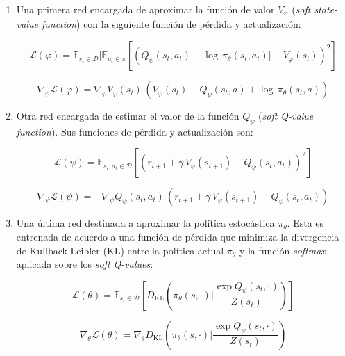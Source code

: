 \begin{enumerate}
    \item Una primera red encargada de aproximar la función de valor $V_\varphi$ (\textit{soft state-value function}) con la siguiente función de pérdida y actualización:
    
        \begin{equation}
            \mathcal{L}(\varphi) = \mathds{E}_{s_t \in \mathcal{D}} [\mathds{E}_{a_{t} \in \pi} [(Q_\psi(s_{t}, a_{t}) - \log \, \pi_\theta(s_t, a_t)] - V_\varphi(s_t) )^2]
        \end{equation}
    
        \begin{equation}
            \nabla_\varphi \mathcal{L}(\varphi) = \nabla_\varphi V_\varphi(s_t) \, (V_\varphi(s_t) - Q_\psi(s_{t}, a) + \log \, \pi_\theta(s_t, a) )
        \end{equation}
    
    \item Otra red encargada de estimar el valor de la función $Q_\psi$ (\textit{soft Q-value function}). Sus funciones de pérdida y actualización son:
    
        \begin{equation}
            \mathcal{L}(\psi) = \mathds{E}_{s_t, a_t \in \mathcal{D}} [(r_{t+1} + \gamma \, V_\varphi(s_{t+1}) - Q_\psi(s_t, a_t))^2]
        \end{equation}
        
        \begin{equation}
            \nabla_\psi \mathcal{L}(\psi) = - \nabla_\psi Q_\psi(s_t, a_t) \, (r_{t+1} + \gamma \, V_\varphi(s_{t+1}) - Q_\psi(s_t, a_t))
        \end{equation}
    
    \item Una última red destinada a aproximar la política estocástica $\pi_\theta$. Esta es entrenada de acuerdo a una función de pérdida que minimiza la divergencia de Kullback-Leibler (KL) \cite{haarnoja2018soft} entre la política actual $\pi_\theta$ y la función \textit{softmax} aplicada sobre los \textit{soft Q-values}:
    
        \begin{equation}
            \mathcal{L}(\theta) = \mathds{E}_{s_t \in \mathcal{D}} [D_\text{KL}(\pi_\theta(s, \cdot) | \frac{\exp Q_\psi(s_t, \cdot)}{Z(s_t)})] 
        \end{equation}
        
        \begin{equation}
            \nabla_\theta \mathcal{L}(\theta) = \nabla_\theta D_\text{KL}(\pi_\theta(s, \cdot) | \frac{\exp Q_\psi(s_t, \cdot)}{Z(s_t)})
        \end{equation}

\end{enumerate}


